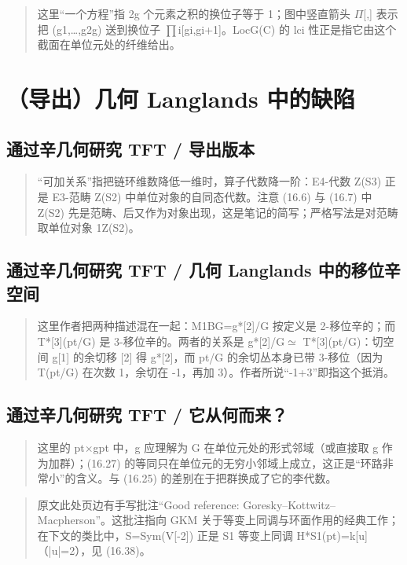 \begin{quote}\small
这里“一个方程”指 2g 个元素之积的换位子等于 1；图中竖直箭头 $\Pi$[,] 表示把 (g1,…,g2g) 送到换位子 $\prod$i[gi,gi+1]。LocG(C) 的 lci 性正是指它由这个截面在单位元处的纤维给出。
\end{quote}

\section{（导出）几何 Langlands 中的缺陷}
\subsection*{通过辛几何研究 TFT / 导出版本}
\begin{quote}\small
“可加关系”指把链环维数降低一维时，算子代数降一阶：E4-代数 Z(S3) 正是 E3-范畴 Z(S2) 中单位对象的自同态代数。注意 (16.6) 与 (16.7) 中 Z(S2) 先是范畴、后又作为对象出现，这是笔记的简写；严格写法是对范畴取单位对象 1Z(S2)。
\end{quote}

\subsection*{通过辛几何研究 TFT / 几何 Langlands 中的移位辛空间}
\begin{quote}\small
这里作者把两种描述混在一起：M1BG=g*[2]/G 按定义是 2-移位辛的；而 T*[3](pt/G) 是 3-移位辛的。两者的关系是 g*[2]/G$\simeq$ T*[3](pt/G)：切空间 g[1] 的余切移 [2] 得 g*[2]，而 pt/G 的余切丛本身已带 3-移位（因为 T(pt/G) 在次数 1，余切在 -1，再加 3）。作者所说“-1+3”即指这个抵消。
\end{quote}

\subsection*{通过辛几何研究 TFT / 它从何而来？}
\begin{quote}\small
这里的 pt$\times$gpt 中，g 应理解为 G 在单位元处的形式邻域（或直接取 g 作为加群）；(16.27) 的等同只在单位元的无穷小邻域上成立，这正是“环路非常小”的含义。与 (16.25) 的差别在于把群换成了它的李代数。
\end{quote}

\begin{quote}\small
原文此处页边有手写批注“Good reference: Goresky--Kottwitz--Macpherson”。这批注指向 GKM 关于等变上同调与环面作用的经典工作；在下文的类比中，S=Sym(V[-2]) 正是 S1 等变上同调 H*S1(pt)=k[u]（|u|=2），见 (16.38)。
\end{quote}

